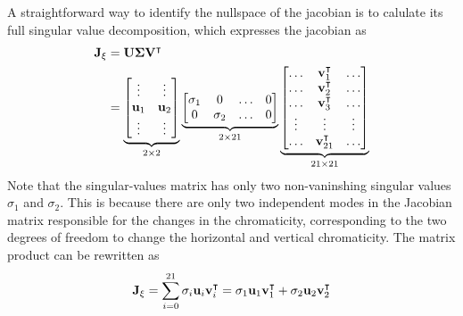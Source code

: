 A straightforward way to identify the nullspace of the jacobian is to calulate its full singular value decomposition, which expresses the jacobian as
\begin{equation*}
    \begin{aligned}
        \vb{J}_\xi &= \vb{U}\boldsymbol{\Sigma}\vb{V}^\intercal\\
                   &= \underbrace{\mqty[\vdots & \vdots \\
                            \vb{u}_1 & \vb{u}_2\\
                            \vdots & \vdots]}_{2\times 2}
                            \underbrace{\mqty[\sigma_1 & 0 & \dots & 0\\
                                             0 & \sigma_2 & \dots & 0 ]}_{2\times21}
                            \underbrace{\mqty[
                                \dots & \vb{v}^\intercal_1 & \dots\\
                                \dots & \vb{v}^\intercal_2 & \dots\\
                                \dots & \vb{v}^\intercal_3 & \dots\\
                                \vdots & \vdots & \vdots\\
                                \dots & \vb{v}^\intercal_{21} & \dots\\                              ]}_{21\times21}
    \end{aligned}
\end{equation*}
Note that the singular-values matrix has only two non-vaninshing singular values $\sigma_1$ and $\sigma_2$. This is because there are only two independent modes in the Jacobian matrix responsible for the changes in the chromaticity, corresponding to the two degrees of freedom to change the horizontal and vertical chromaticity. The matrix product can be rewritten as
\begin{equation}
    \vb{J}_\xi = \sum_{i=0}^{21}\sigma_i\vb{u}_i\vb{v}_{i}^{\intercal} = \sigma_1 \vb{u}_1\vb{v}_{1}^\intercal + \sigma_2 \vb{u}_2\vb{v}_{2}^\intercal
\end{equation}

